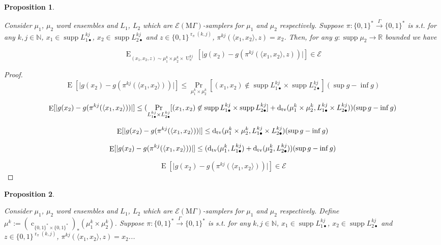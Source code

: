\documentclass{article}
\numberwithin{equation}{section}
\theoremstyle{definition}
\theoremstyle{plain}
\newtheorem{proposition}{Proposition}[section]
\newcommand{\Bool}{\{0,1\}}
\newcommand{\Words}{{\Bool^*}}
\DeclareMathOperator{\Supp}{supp}
\DeclareMathOperator{\Prb}{Pr}
\DeclareMathOperator{\E}{E}
\DeclareMathOperator{\R}{r}
\DeclareMathOperator{\U}{U}
\DeclareMathOperator{\En}{c}
\newcommand{\Dtv}{\operatorname{d}_{\textnormal{tv}}}
\newcommand{\Nats}{\mathbb{N}}
\newcommand{\Reals}{\mathbb{R}}
\newcommand{\Abs}[1]{\lvert #1 \rvert}
\newcommand{\Chev}[1]{\langle #1 \rangle}
\newcommand{\MGrow}{\mathrm{M}\Gamma}
\newcommand{\Fall}{\mathcal{E}}
\newcommand{\Scheme}{\xrightarrow{\Gamma}}
\begin{document}
\begin{samepage}
\begin{proposition}
\label{prp:tbd}

Consider $\mu_1$, $\mu_2$ word ensembles and $L_1$, $L_2$ which are $\Fall(\MGrow)$-samplers for $\mu_1$ and $\mu_2$ respectively. Suppose $\pi: \Words \Scheme \Words$ is s.t. for any $k,j \in \Nats$, $x_1 \in \Supp L_{1\bullet}^{kj}$, ${x_2 \in \Supp L_{2\bullet}^{kj}}$ and $z \in \Bool^{\R_\pi(k,j)}$, $\pi^{kj}(\Chev{x_1,x_2},z)=x_2$. Then, for any $g: \Supp \mu_2 \rightarrow \Reals$ bounded we have 

$$\E_{(x_1,x_2,z) \sim\mu_1^k \times \mu_2^k \times \U_\pi^{kj}}[\Abs{g(x_2)-g(\pi^{kj}(\Chev{x_1,x_2},z))}] \in \Fall$$

\end{proposition}
\end{samepage}

\begin{proof}

$$\E[\Abs{g(x_2)-g(\pi^{kj}(\Chev{x_1,x_2}))}] \leq \Prb_{ \mu_1^k \times \mu_2^k}[(x_1,x_2) \not\in \Supp L_{1\bullet}^{kj} \times \Supp L_{2\bullet}^{kj}] (\sup g - \inf g)$$

$$\E[\Abs{g(x_2)-g(\pi^{kj}(\Chev{x_1,x_2}))}] \leq (\Prb_{ L_{1\bullet}^{kj} \times L_{2\bullet}^{kj}}[(x_1,x_2) \not\in \Supp L_{1\bullet}^{kj} \times \Supp L_{2\bullet}^{kj}]+\Dtv(\mu_1^k \times \mu_2^k,L_{1\bullet}^{kj} \times L_{2\bullet}^{kj})) (\sup g - \inf g)$$

$$\E[\Abs{g(x_2)-g(\pi^{kj}(\Chev{x_1,x_2}))}] \leq \Dtv(\mu_1^k \times \mu_2^k,L_{1\bullet}^{kj} \times L_{2\bullet}^{kj}) (\sup g - \inf g)$$

$$\E[\Abs{g(x_2)-g(\pi^{kj}(\Chev{x_1,x_2}))}] \leq (\Dtv(\mu_1^k,L_{1\bullet}^{kj})+\Dtv(\mu_2^k,L_{2\bullet}^{kj})) (\sup g - \inf g)$$

$$\E[\Abs{g(x_2)-g(\pi^{kj}(\Chev{x_1,x_2}))}] \in \Fall$$

\end{proof}

\begin{samepage}
\begin{proposition}
\label{prp:tbd}

Consider $\mu_1$, $\mu_2$ word ensembles and $L_1$, $L_2$ which are $\Fall(\MGrow)$-samplers for $\mu_1$ and $\mu_2$ respectively. Define ${\mu^k:=(\En_{\Words \times \Words})_*(\mu_1^k \times \mu_2^k)}$. Suppose $\pi: \Words \Scheme \Words$ is s.t. for any $k,j \in \Nats$, $x_1 \in \Supp L_{1\bullet}^{kj}$, ${x_2 \in \Supp L_{2\bullet}^{kj}}$ and $z \in \Bool^{\R_\pi(k,j)}$, $\pi^{kj}(\Chev{x_1,x_2},z)=x_2$...

\end{proposition}
\end{samepage}
\end{document}
